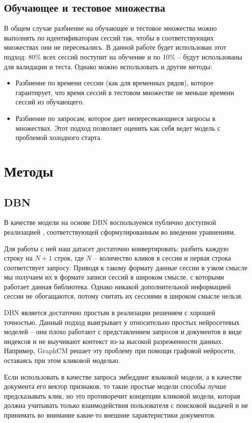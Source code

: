 \documentclass[diploma]{nanolab2015}
\begin{document}
\subsection{Обучающее и тестовое множества}
В общем случае разбиение на обучающее и тестовое множества можно выполнять по идентификаторам сессий так, чтобы в соответствующих множествах они не пересекались. В данной работе будет использован этот подход: 80\% всех сессий поступит на обучение и по 10\% -- будут использованы для валидации и теста. Однако можно использовать и другие методы:
\begin{itemize}
    \item Разбиение по времени сессии (как для временных рядов), которое гарантирует, что время сессий в тестовом множестве не меньше времени сессий из обучающего.
    \item Разбиение по запросам, которое дает непересекающиеся запросы в множествах. Этот подход позволяет оценить как себя ведет модель с проблемой холодного старта.
\end{itemize}

\section{Методы}
\subsection{DBN}
В качестве модели на основе DBN воспользуемся публично доступной реализацией \cite{dbngithub}, соответствующей сформулированным во введении уравнениям.

Для работы с ней наш датасет достаточно конвертировать: разбить каждую строку на $N+1$ строк, где $N$ -- количество кликов в сессии и первая строка соответствует запросу. Приводя к такому формату данные сессии в узком смысле мы получаем их в формате записи сессий в широком смысле, с которыми работает данная библиотека. Однако никакой дополнительной информацией сессии не обогащаются, потому считать их сессиями в широком смысле нельзя.

DBN является достаточно простым в реализации решением с хорошей точностью. Данный подход выигрывает у относительно простых нейросетевых моделей -- они плохо работают с представлением запросов и документов в виде индексов и не выучивают контекст из-за высокой разреженности данных. Например, GraphCM решает эту проблему при помощи графовой нейросети, оставаясь при этом кликовой моделью.

Если использовать в качестве запроса эмбеддинг языковой модели, а в качестве документа его вектор признаков, то такие простые модели способы лучше предсказывать клик, но это противоречит концепции кликовой модели, которая должна учитывать только взаимодействия пользователя с поисковой выдачей и не принимать во внимание какие-то внешние характеристики документов.
\end{document}
